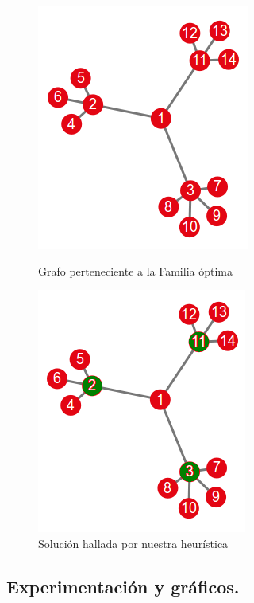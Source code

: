 \begin{figure}[!htb]
\begin{center}
  \includegraphics[scale=0.5]{imagenes/familia3.png}
\end{center}
  \caption{Grafo perteneciente a la Familia óptima}\label{fig:familia3}
\endminipage\hfill
{}
\begin{center}
  \includegraphics[scale=0.5]{imagenes/familia3-res.png}
\end{center}
  \caption{Solución hallada por nuestra heurística}\label{fig:familia3res}
\endminipage
\end{figure}


\vspace*{0.6cm}

\subsection{Experimentación y gráficos.}

\vspace*{0.3cm}

